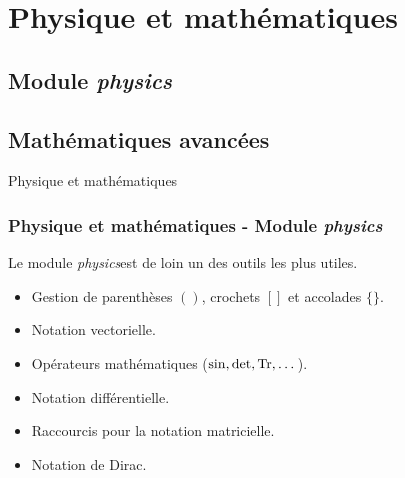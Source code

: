 
\section{Physique et mathématiques}

\subsection{Module \textit{physics}}

\subsection{Mathématiques avancées}

\begin{frame}
    \vfill
    \begin{center}
        \large
        Physique et mathématiques
    \end{center}
    \vfill
\end{frame}

\begin{frame}
    \frametitle{Physique et mathématiques - Module \textit{physics}}
    Le module \textcolor{vibrant_green}{\textit{physics}}\footnotemark est de loin un des outils les plus utiles.
    \pause
    \vspace{0.3cm}
    \begin{itemize}
        \item[$\diamond$] Gestion de parenthèses $()$, crochets $[]$ et accolades $\{\}$.
        \item[$\diamond$] Notation vectorielle.
        \item[$\diamond$] Opérateurs mathématiques ($\sin, \det, \Trace,\dots$).
        \item[$\diamond$] Notation différentielle.
        \item[$\diamond$] Raccourcis pour la notation matricielle.
        \item[$\diamond$] Notation de Dirac.
    \end{itemize}
\end{frame}

